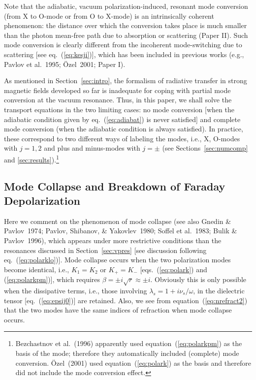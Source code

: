 \documentclass{mn2e}
\newcommand{\etal}{et al.}
\newcommand{\polarb}{\beta}
\newcommand{\lambdad}{\lambda_{s}}
\newcommand{\vpr}{r}
\newcommand{\holai}{Paper I}
\newcommand{\laiho}{Paper II}
\begin{document}
{Note that the adiabatic, vacuum polarization-induced, resonant
mode conversion (from X to O-mode or from O to X-mode) is
an intrinsically coherent phenomenon: the distance over which
the conversion takes place is much smaller than the photon
mean-free path due to absorption or scattering (\laiho).
Such mode conversion is clearly different from the incoherent
mode-switching due to scattering
[see eq.~(\ref{eq:kesji})], which has been included in previous
works (e.g., Pavlov \etal~1995; \"{O}zel~2001; \holai).

As mentioned in Section~\ref{sec:intro}, the formalism of radiative
transfer in strong magnetic fields developed so far is inadequate
for coping with partial mode conversion at the vacuum
resonance.  Thus, in this paper, we shall solve the transport
equations in the two limiting cases: no mode conversion
[when the adiabatic condition given by eq.~(\ref{eq:adiabat}) is never
satisfied] and complete mode conversion (when the adiabatic condition
is always satisfied).  In practice, these correspond to two different
ways of labeling the modes, i.e., X, O-modes with $j=1,2$ and plus
and minus-modes with $j=\pm$ (see Sections~\ref{sec:numcomp} and
\ref{sec:results}).\footnote{Bezchastnov \etal~(1996) apparently
used equation~(\ref{eq:polarkpm}) as the basis of the mode;
therefore they automatically included (complete) mode conversion.
\"{O}zel~(2001) used equation~(\ref{eq:polark}) as the basis and
therefore did not include the mode conversion effect.}

\subsection{Mode Collapse and Breakdown of Faraday Depolarization}
\label{sec:mcp}

Here we comment on the phenomenon of mode collapse
(see also Gnedin \& Pavlov~1974; Pavlov, Shibanov, \& Yakovlev~1980;
Soffel \etal~1983; Bulik \& Pavlov~1996), which appears
under more restrictive conditions than the resonances discussed in
Section~\ref{sec:vpres} [see discussion following eq.~(\ref{eq:polarklo})].
Mode collapse occurs when the two polarization modes become identical,
i.e., $K_1=K_2$ or $K_+=K_-$ [eqs.~(\ref{eq:polark}) and (\ref{eq:polarkpm})],
which requires $\polarb=\pm i\sqrt{\vpr}\approx\pm i$.
Obviously this is only possible when the dissipative terms, i.e.,
those involving $\lambdad=1+i\nu_s/\omega$, in the dielectric
tensor [eq.~(\ref{eq:epsij0})] are retained.  Also, we see from
equation~(\ref{eq:nrefract2}) that the two modes have the same
indices of refraction when mode collapse occurs.

}
\end{document}
